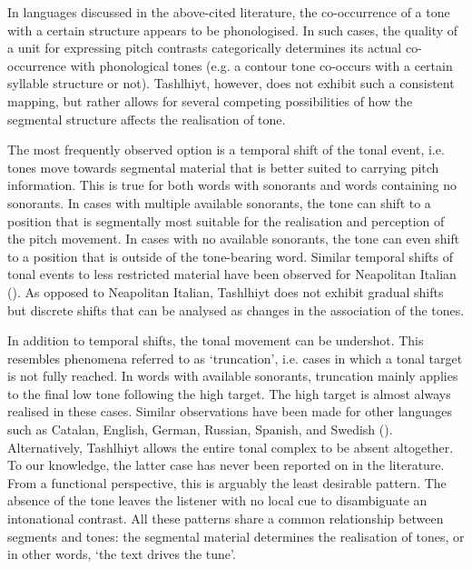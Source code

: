 In languages discussed in the above-cited literature, the co-occurrence of a tone with a certain structure appears to be phonologised. In such cases, the quality of a unit for expressing pitch contrasts categorically determines its actual co-occurrence with phonological tones (e.g. a contour tone co-occurs with a certain syllable structure or not). Tashlhiyt, however, does not exhibit such a consistent mapping, but rather allows for several competing possibilities of how the segmental structure affects the realisation of tone.

The most frequently observed option is a temporal shift of the tonal event, i.e. tones move towards segmental material that is better suited to carrying pitch information. This is true for both words with sonorants and words containing no sonorants. In cases with multiple available sonorants, the tone can shift to a position that is segmentally most suitable for the realisation and perception of the pitch movement. In cases with no available sonorants, the tone can even shift to a position that is outside of the tone-bearing word. Similar temporal shifts of tonal events to less restricted material have been observed for Neapolitan Italian  (\citealt{CangemiGrice2016}). As opposed to Neapolitan Italian, Tashlhiyt does not exhibit gradual shifts but discrete shifts that can be analysed as changes in the association of the tones.

In addition to temporal shifts, the tonal movement can be undershot. This resembles phenomena referred to as ‘truncation’, i.e. cases in which a tonal target is not fully reached. In words with available sonorants, truncation mainly applies to the final low tone following the high target. The high target is almost always realised in these cases. Similar observations have been made for other languages such as Catalan, English, German, Russian, Spanish, and Swedish (\citealt{EriksonAlstermark1972,Grabe1998,Grabe.etal2000,PrietoOrtega2009,Rathcke2009}). Alternatively, Tashlhiyt allows the entire tonal complex to be absent altogether. To our knowledge, the latter case has never been reported on in the literature. From a functional perspective, this is arguably the least desirable pattern. The absence of the tone leaves the listener with no local cue to disambiguate an intonational contrast. All these patterns share a common relationship between segments and tones: the segmental material determines the realisation of tones, or in other words, ‘the text drives the tune’.  

